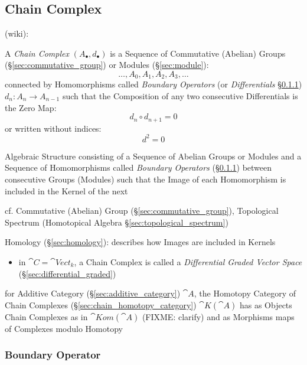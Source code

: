 \subsection{Chain Complex}\label{sec:chain_complex}

(wiki):

A \emph{Chain Complex} $(A_\bullet, d_\bullet)$ is a Sequence of Commutative
(Abelian) Groups (\S\ref{sec:commutative_group}) or Modules
(\S\ref{sec:module}):
\[
  \ldots, A_0, A_1, A_2, A_3, \ldots
\]
connected by Homomorphisms called \emph{Boundary Operators} (or
\emph{Differentials} \S\ref{sec:boundary_operator}) $d_n : A_n \rightarrow
A_{n-1}$ such that the Composition of any two consecutive Differentials is
the Zero Map:
\[
  d_n \circ d_{n+1} = 0
\]
or written without indices:
\[
  d^2 = 0
\]

Algebraic Structure consisting of a Sequence of Abelian Groups or Modules and a
Sequence of Homomorphisms called \emph{Boundary Operators}
(\S\ref{sec:boundary_operator}) between consecutive Groups (Modules) such that
the Image of each Homomorphism is included in the Kernel of the next

\fist cf. Commutative (Abelian) Group (\S\ref{sec:commutative_group}),
Topological Spectrum (Homotopical Algebra \S\ref{sec:topological_spectrum})

\fist Homology (\S\ref{sec:homology}): describes how Images are included in
Kernels

\begin{itemize}
  \item in $\cat{C} = \cat{Vect}_k$, a Chain Complex is called a
    \emph{Differential Graded Vector Space} (\S\ref{sec:differential_graded})
\end{itemize}

\fist for Additive Category (\S\ref{sec:additive_category}) $\cat{A}$, the
Homotopy Category of Chain Complexes (\S\ref{sec:chain_homotopy_category})
$\cat{K}(\cat{A})$ has as Objects Chain Complexes as in $\cat{Kom}(\cat{A})$
(FIXME: clarify) and as Morphisms maps of Complexes modulo Homotopy



\subsubsection{Boundary Operator}\label{sec:boundary_operator}

